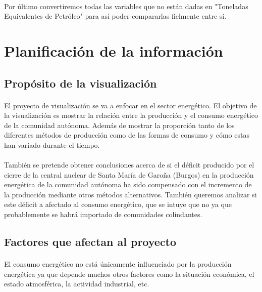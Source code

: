 \documentclass[11pt,spanish]{article}
\begin{document}
			 \paragraph{}
			 Por último convertiremos todas las variables que no están dadas en "Toneladas Equivalentes de Petróleo" para así poder compararlas fielmente entre sí.


	\section{Planificación de la información}

		\subsection{Propósito de la visualización}

			\paragraph{}
			El proyecto de visualización se va a enfocar en el sector energético. El objetivo de la visualización es mostrar la relación entre la producción y el consumo energético de la comunidad autónoma. Además de mostrar la proporción tanto de los diferentes métodos de producción como de las formas de consumo y cómo estas han variado durante el tiempo.

			\paragraph{}
			También se pretende obtener conclusiones acerca de si el déficit producido por el cierre de la central nuclear de Santa María de Garoña (Burgos) en la producción energética de la comunidad autónoma ha sido compensado con el incremento de la producción mediante otros métodos alternativos. También queremos analizar si este déficit a afectado al consumo energético, que se intuye que no ya que probablemente se habrá importado de comunidades colindantes.

		\subsection{Factores que afectan al proyecto}

			\paragraph{}
			El  consumo energético no está únicamente influenciado por la producción energética ya que depende muchos otros factores como la situación económica, el estado atmosférica, la actividad industrial, etc.
\end{document}
